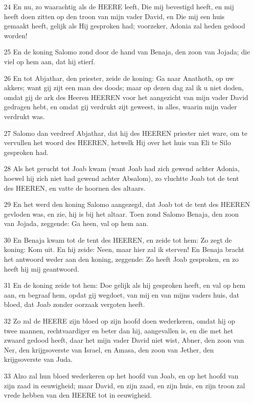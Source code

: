 \par 24 En nu, zo waarachtig als de HEERE leeft, Die mij bevestigd heeft, en mij heeft doen zitten op den troon van mijn vader David, en Die mij een huis gemaakt heeft, gelijk als Hij gesproken had; voorzeker, Adonia zal heden gedood worden!
\par 25 En de koning Salomo zond door de hand van Benaja, den zoon van Jojada; die viel op hem aan, dat hij stierf.
\par 26 En tot Abjathar, den priester, zeide de koning: Ga naar Anathoth, op uw akkers; want gij zijt een man des doods; maar op dezen dag zal ik u niet doden, omdat gij de ark des Heeren HEEREN voor het aangezicht van mijn vader David gedragen hebt, en omdat gij verdrukt zijt geweest, in alles, waarin mijn vader verdrukt was.
\par 27 Salomo dan verdreef Abjathar, dat hij des HEEREN priester niet ware, om te vervullen het woord des HEEREN, hetwelk Hij over het huis van Eli te Silo gesproken had.
\par 28 Als het gerucht tot Joab kwam (want Joab had zich gewend achter Adonia, hoewel hij zich niet had gewend achter Absalom), zo vluchtte Joab tot de tent des HEEREN, en vatte de hoornen des altaars.
\par 29 En het werd den koning Salomo aangezegd, dat Joab tot de tent des HEEREN gevloden was, en zie, hij is bij het altaar. Toen zond Salomo Benaja, den zoon van Jojada, zeggende: Ga heen, val op hem aan.
\par 30 En Benaja kwam tot de tent des HEEREN, en zeide tot hem: Zo zegt de koning: Kom uit. En hij zeide: Neen, maar hier zal ik sterven! En Benaja bracht het antwoord weder aan den koning, zeggende: Zo heeft Joab gesproken, en zo heeft hij mij geantwoord.
\par 31 En de koning zeide tot hem: Doe gelijk als hij gesproken heeft, en val op hem aan, en begraaf hem, opdat gij wegdoet, van mij en van mijns vaders huis, dat bloed, dat Joab zonder oorzaak vergoten heeft.
\par 32 Zo zal de HEERE zijn bloed op zijn hoofd doen wederkeren, omdat hij op twee mannen, rechtvaardiger en beter dan hij, aangevallen is, en die met het zwaard gedood heeft, daar het mijn vader David niet wist, Abner, den zoon van Ner, den krijgsoverste van Israel, en Amasa, den zoon van Jether, den krijgsoverste van Juda.
\par 33 Alzo zal hun bloed wederkeren op het hoofd van Joab, en op het hoofd van zijn zaad in eeuwigheid; maar David, en zijn zaad, en zijn huis, en zijn troon zal vrede hebben van den HEERE tot in eeuwigheid.
